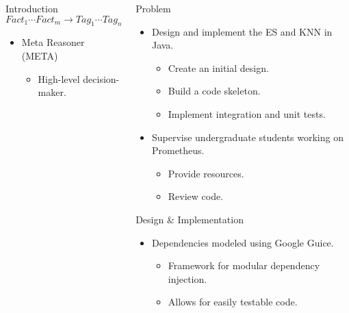 \documentclass[final]{beamer} %
\newlength{\columnheight}
\begin{document}
\begin{frame}
\begin{columns}
\begin{column}{.3\textwidth}
{\begin{block}{Introduction}
					\begin{equation} \label{eq:rule}
					Fact_1 \cdots Fact_m \rightarrow Tag_1 \cdots Tag_n
					\end{equation}
					
					\begin{itemize}
						\item Meta Reasoner (META)
						\begin{itemize}
							\item High-level decision-maker.
						\end{itemize}
					\end{itemize}
				
				\end{block}
			}
			\end{column}
			\begin{column}{.34\textwidth}
				\parbox[t][\columnheight]{\textwidth}{
				
				\begin{block}{Problem}
					\begin{itemize}
						\item Design and implement the ES and KNN in Java.
						\begin{itemize}
							\item Create an initial design.
							\item Build a code skeleton.
							\item Implement integration and unit tests.
						\end{itemize}
						
						\item Supervise undergraduate students working on Prometheus.
						\begin{itemize}
							\item Provide resources.
							\item Review code.
						\end{itemize}
					\end{itemize}
				\end{block}
					
				\begin{block}{Design \& Implementation}
					\begin{itemize}
						\item Dependencies modeled using Google Guice.
						\begin{itemize}
							\item Framework for modular dependency injection.
							\item Allows for easily testable code.
						\end{itemize}
					\end{itemize}
					

\end{block}}
\end{column}
\end{columns}
\end{frame}
\end{document}
